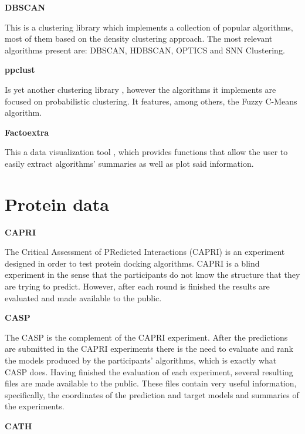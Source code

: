 \textbf{DBSCAN}

This is a clustering library \cite{hahsler2017dbscan} which implements a collection of popular algorithms, most of them based on the density clustering approach. The most relevant algorithms present are: \gls{DBSCAN}, HDBSCAN, OPTICS and \gls{SNN} Clustering.

\medskip
\textbf{ppclust}

Is yet another clustering library \cite{ppclust2018}, however the algorithms it implements are focused on probabilistic clustering. It features, among others, the Fuzzy C-Means algorithm.

\medskip
\textbf{Factoextra}

This a data visualization tool \cite{kassambara2016factoextra}, which provides functions that allow the user to easily extract algorithms’ summaries as well as plot said information.

\section{Protein data}

\medskip
\textbf{CAPRI}

The Critical Assessment of PRedicted Interactions (CAPRI) \cite{janin2005assessing} is an experiment designed in order to test protein docking algorithms. CAPRI is a blind experiment in the sense that the participants do not know the structure that they are trying to predict. However, after each round is finished the results are evaluated and made available to the public.

\medskip
\textbf{CASP}

The \gls{CASP} \cite{moult1995large} is the complement of the CAPRI experiment. After the predictions are submitted in the CAPRI experiments there is the need to evaluate and rank the models produced by the participants' algorithms, which is exactly what \gls{CASP} does. Having finished the evaluation of each experiment, several resulting files are made available to the public. These files contain very useful information, specifically, the coordinates of the prediction and target models and summaries of the experiments.

\medskip
\textbf{CATH}

